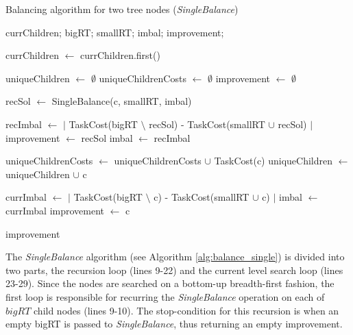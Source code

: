 \begin{algorithm}[!h]
\footnotesize
		\caption{Balancing algorithm for two tree nodes ({\em SingleBalance})\label{alg:balance_single}}

		\begin{algorithmic}[1]
		 currChildren; bigRT; smallRT; imbal;
		 improvement;

			\State currChildren $\gets$ currChildren.first()
		\EndWhile

		\State uniqueChildren $\gets$ $\emptyset$
		\State uniqueChildrenCosts $\gets$ $\emptyset$
		\State improvement $\gets$ $\emptyset$
			
			\State recSol $\gets$ SingleBalance(c, smallRT, imbal)
			
				\State recImbal $\gets$ $|$ TaskCost(bigRT $\setminus$ recSol) - TaskCost(smallRT $\cup$ recSol) $|$
					\State improvement $\gets$ recSol
					\State imbal $\gets$ recImbal
				\EndIf
			\EndIf

				\State uniqueChildrenCosts $\gets$ uniqueChildrenCosts $\cup$ TaskCost(c)
				\State uniqueChildren $\gets$ uniqueChildren $\cup$ c
			\EndIf

		\EndFor

			\State currImbal $\gets$ $|$ TaskCost(bigRT $\setminus$ c) - TaskCost(smallRT $\cup$ c) $|$
						\State imbal $\gets$ currImbal
						\State improvement $\gets$ c
				\EndIf
		\EndFor

		 improvement

		\end{algorithmic}
\end{algorithm}

The {\em SingleBalance} algorithm (see Algorithm \ref{alg:balance_single}) is divided into two parts, the recursion loop (lines 9-22) and the current level search loop (lines 23-29). Since the nodes are searched on a bottom-up breadth-first fashion, the first loop is responsible for recurring the {\em SingleBalance} operation on each of $bigRT$ child nodes (lines 9-10). The stop-condition for this recursion is when an empty bigRT is passed to {\em SingleBalance}, thus returning an empty improvement.

